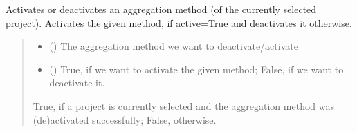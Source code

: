 \documentclass[letterpaper,10pt,english]{sphinxmanual}
\begin{document}
\begin{fulllineitems}
\begin{fulllineitems}
\label{\detokenize{apidoc/src.osm_configurator.control:src.osm_configurator.control.aggregation_controller.AggregationController.set_aggregation_method_active}}
\pysigstartsignatures
{}
\pysigstopsignatures
\sphinxAtStartPar
Activates or deactivates an aggregation method (of the currently selected project).
Activates the given method, if active=True and deactivates it otherwise.
\begin{quote}\begin{description}
\begin{itemize}
\item {} 
\sphinxAtStartPar
{} ({\hyperref[\detokenize{apidoc/src.osm_configurator.model.project.calculation:src.osm_configurator.model.project.calculation.aggregation_method_enum.AggregationMethod}]{}}) \textendash{} The aggregation method we want to deactivate/activate

\item {} 
\sphinxAtStartPar
{} () \textendash{} True, if we want to activate the given method; False, if we want to deactivate it.

\end{itemize}

\sphinxAtStartPar
True, if a project is currently selected and the aggregation method was (de\sphinxhyphen{})activated successfully; False, otherwise.

\sphinxAtStartPar
{}

\end{description}\end{quote}

\end{fulllineitems}


\end{fulllineitems}
\end{document}
